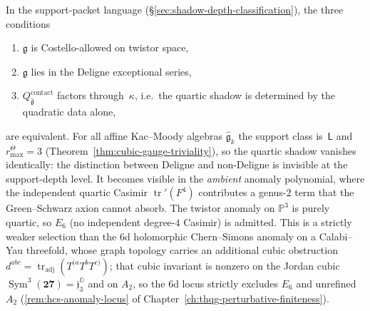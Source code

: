 \begin{remark}
\label{rem:ht-twistor-shadow}
In the support-packet language
(\S\ref{sec:shadow-depth-classification}), the three
conditions
\begin{enumerate}[label=\textup{(\alph*)}]
\item $\mathfrak{g}$ is Costello-allowed on twistor space,
\item $\mathfrak{g}$ lies in the Deligne exceptional series,
\item $Q^{\mathrm{contact}}_{\widehat{\mathfrak{g}}}$
 factors through~$\kappa$, i.e.\
 the quartic shadow is determined by the quadratic data alone,
\end{enumerate}
are equivalent.
For all affine Kac--Moody algebras
$\widehat{\mathfrak{g}}_k$ the support class is~$\mathsf{L}$
and \(r^\Theta_{\max}=3\)
(Theorem~\ref{thm:cubic-gauge-triviality}), so
the quartic shadow vanishes identically: the distinction
between Deligne and non-Deligne is invisible at the
support-depth level. It becomes visible in the \emph{ambient}
anomaly polynomial, where the independent quartic Casimir
$\operatorname{tr}'(F^4)$ contributes a genus-$2$ term
that the Green--Schwarz axion cannot absorb.
The twistor anomaly on $\mathbb{P}^3$ is purely quartic, so $E_6$
(no independent degree-$4$ Casimir) is admitted. This is a strictly
weaker selection than the $6$d holomorphic Chern--Simons anomaly on a
Calabi--Yau threefold, whose graph topology carries an additional cubic
obstruction $d^{abc} = \operatorname{tr}_{\mathrm{adj}}(T^{(a}T^bT^{c)})$;
that cubic invariant is nonzero on the Jordan cubic
$\operatorname{Sym}^3(\mathbf{27}) = \mathfrak{j}_3^{\mathbb{O}}$ and on
$A_2$, so the $6$d locus strictly excludes $E_6$ and unrefined $A_2$
(\ref{rem:hcs-anomaly-locus} of
Chapter~\ref{ch:thqg-perturbative-finiteness}).
\end{remark}


